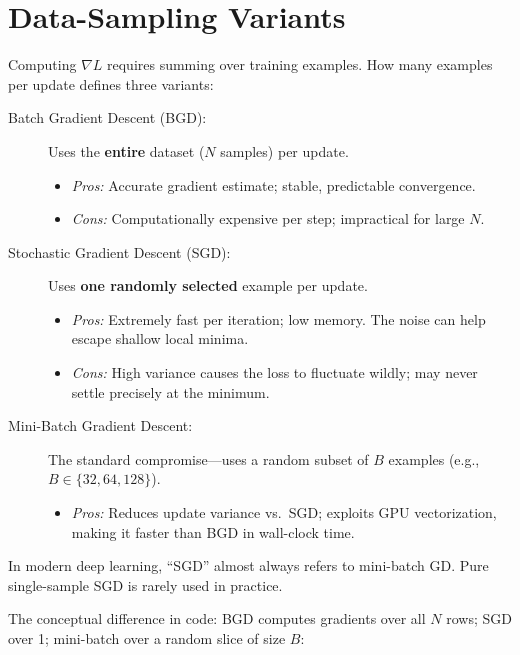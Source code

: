 \section*{Data-Sampling Variants}

Computing $\nabla L$ requires summing over training examples. How many examples per update defines three variants:

\begin{description}
    \item[Batch Gradient Descent (BGD):] Uses the \textbf{entire} dataset ($N$ samples) per update.
    \begin{itemize}
        \item \textit{Pros:} Accurate gradient estimate; stable, predictable convergence.
        \item \textit{Cons:} Computationally expensive per step; impractical for large $N$.
    \end{itemize}

    \item[Stochastic Gradient Descent (SGD):] Uses \textbf{one randomly selected} example per update.
    \begin{itemize}
        \item \textit{Pros:} Extremely fast per iteration; low memory. The noise can help escape shallow local minima.
        \item \textit{Cons:} High variance causes the loss to fluctuate wildly; may never settle precisely at the minimum.
    \end{itemize}

    \item[Mini-Batch Gradient Descent:] The standard compromise---uses a random subset of $B$ examples (e.g., $B \in \{32, 64, 128\}$).
    \begin{itemize}
        \item \textit{Pros:} Reduces update variance vs.\ SGD; exploits GPU vectorization, making it faster than BGD in wall-clock time.
    \end{itemize}
\end{description}

\begin{remark}[Terminology]
In modern deep learning, ``SGD'' almost always refers to mini-batch GD. Pure single-sample SGD is rarely used in practice.
\end{remark}

The conceptual difference in code: BGD computes gradients over all $N$ rows; SGD over 1; mini-batch over a random slice of size $B$:

